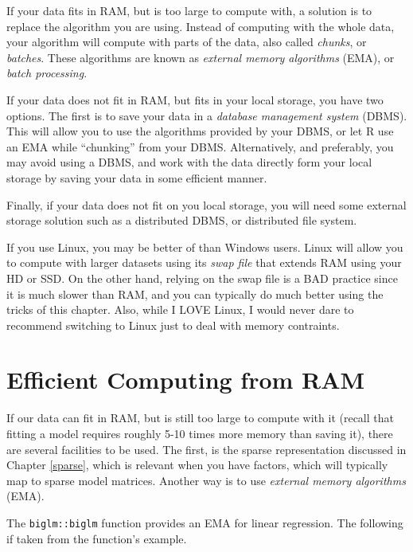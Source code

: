 \documentclass[]{book}
\theoremstyle{definition}
\theoremstyle{definition}
\theoremstyle{definition}
\theoremstyle{remark}
\let\BeginKnitrBlock\begin \let\EndKnitrBlock\end
\begin{document}
If your data fits in RAM, but is too large to compute with, a solution is to replace the algorithm you are using.
Instead of computing with the whole data, your algorithm will compute with parts of the data, also called \emph{chunks}, or \emph{batches}.
These algorithms are known as \emph{external memory algorithms} (EMA), or \emph{batch processing}.

If your data does not fit in RAM, but fits in your local storage, you have two options.
The first is to save your data in a \emph{database management system} (DBMS).
This will allow you to use the algorithms provided by your DBMS, or let R use an EMA while ``chunking'' from your DBMS.
Alternatively, and preferably, you may avoid using a DBMS, and work with the data directly form your local storage by saving your data in some efficient manner.

Finally, if your data does not fit on you local storage, you will need some external storage solution such as a distributed DBMS, or distributed file system.

\BeginKnitrBlock{remark}
{}If you use Linux, you may be better of than Windows users.
Linux will allow you to compute with larger datasets using its \emph{swap file} that extends RAM using your HD or SSD.
On the other hand, relying on the swap file is a BAD practice since it is much slower than RAM, and you can typically do much better using the tricks of this chapter.
Also, while I LOVE Linux, I would never dare to recommend switching to Linux just to deal with memory contraints.
\EndKnitrBlock{remark}

\hypertarget{efficient-computing-from-ram}{%
\section{Efficient Computing from RAM}\label{efficient-computing-from-ram}}

If our data can fit in RAM, but is still too large to compute with it (recall that fitting a model requires roughly 5-10 times more memory than saving it), there are several facilities to be used.
The first, is the sparse representation discussed in Chapter \ref{sparse}, which is relevant when you have factors, which will typically map to sparse model matrices.
Another way is to use \emph{external memory algorithms} (EMA).

The \texttt{biglm::biglm} function provides an EMA for linear regression.
The following if taken from the function's example.
\end{document}
